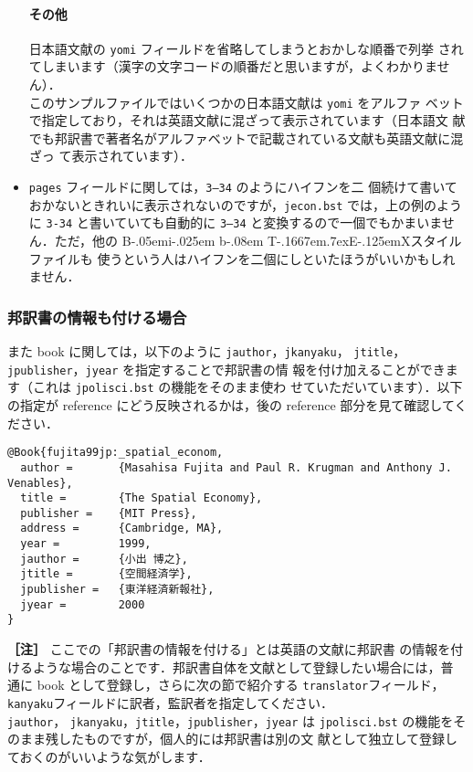 \documentclass[a4j,10pt]{jarticle}
\def\BibTeX{{\rm B\kern-.05em{\sc i\kern-.025em b}\kern-.08em
    T\kern-.1667em\lower.7ex\hbox{E}\kern-.125emX}}
\begin{document}
\begin{itemize}
       \paragraph{その他}
       日本語文献の \texttt{yomi} フィールドを省略してしまうとおかしな順番で列挙
       されてしまいます（漢字の文字コードの順番だと思いますが，よくわかりません）．
       \\このサンプルファイルではいくつかの日本語文献は \texttt{yomi} をアルファ
       ベットで指定しており，それは英語文献に混ざって表示されています（日本語文
       献でも邦訳書で著者名がアルファベットで記載されている文献も英語文献に混ざっ
       て表示されています）．
 \item \texttt{pages} フィールドに関しては，\texttt{3--34} のようにハイフンを二
       個続けて書いておかないときれいに表示されないのですが，\texttt{jecon.bst}
       では，上の例のように \texttt{3-34} と書いていても自動的に \texttt{3--34}
       と変換するので一個でもかまいません．ただ，他の \BibTeX スタイルファイルも
       使うという人はハイフンを二個にしといたほうがいいかもしれません．
\end{itemize}

\subsubsection{邦訳書の情報も付ける場合} \label{sec:hoyakusho}

また book に関しては，以下のように \texttt{jauthor}，\texttt{jkanyaku}，
\texttt{jtitle}，\texttt{jpublisher}，\texttt{jyear} を指定することで邦訳書の情
報を付け加えることができます（これは \texttt{jpolisci.bst} の機能をそのまま使わ
せていただいています）．以下の指定が reference にどう反映されるかは，後の
reference 部分を見て確認してください．\\

\begin{screen}
 \begin{verbatim}
@Book{fujita99jp:_spatial_econom,
  author =       {Masahisa Fujita and Paul R. Krugman and Anthony J. Venables},
  title =        {The Spatial Economy},
  publisher =    {MIT Press},
  address =      {Cambridge, MA},
  year =         1999,
  jauthor =      {小出 博之},
  jtitle =       {空間経済学},
  jpublisher =   {東洋経済新報社},
  jyear =        2000
}
 \end{verbatim}
\end{screen}
\vspace*{1em}

\noindent \textbf{［注］} ここでの「邦訳書の情報を付ける」とは英語の文献に邦訳書
の情報を付けるような場合のことです．邦訳書自体を文献として登録したい場合には，普
通に book として登録し，さらに次の節で紹介する \texttt{translator}フィールド，
\texttt{kanyaku}フィールドに訳者，監訳者を指定してください．\\ \texttt{jauthor}，
\texttt{jkanyaku}，\texttt{jtitle}，\texttt{jpublisher}，\texttt{jyear} は
\texttt{jpolisci.bst} の機能をそのまま残したものですが，個人的には邦訳書は別の文
献として独立して登録しておくのがいいような気がします．
\end{document}
